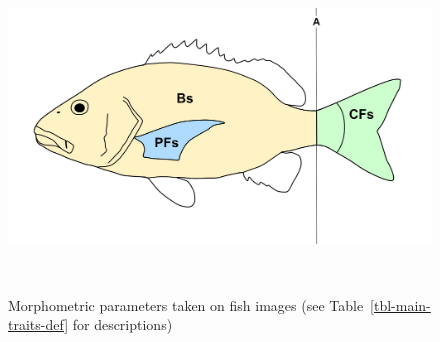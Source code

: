 \documentclass[
  letterpaper,
]{scrbook}
\begin{document}
\begin{figure}
\begin{minipage}[t]{0.80\linewidth}
{{\includegraphics{./images/drawings/main_areas_sketch.png}

}

}

\end{minipage}%
%
\begin{minipage}[t]{0.10\linewidth}

{\centering 

~

}

\end{minipage}%

\caption{\label{fig-main-traits}Morphometric parameters taken on fish
images (see Table~\ref{tbl-main-traits-def} for descriptions)}

\end{figure}
\end{document}

